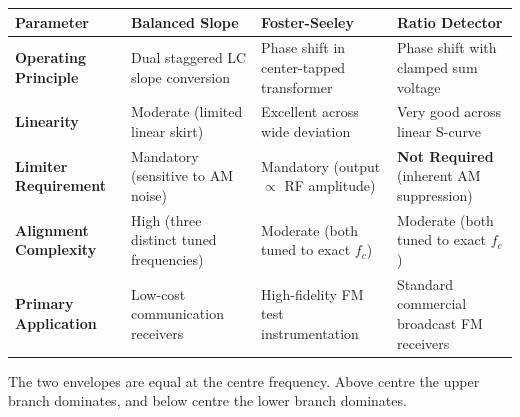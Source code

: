 \documentclass[12pt,a4paper]{article}
\begin{document}
\par\vspace{6pt}\noindent
\begin{tabularx}{\linewidth}{|B{3.2cm}|Y|Y|Y|}
\hline
\textbf{Parameter} & \textbf{Balanced Slope} & \textbf{Foster-Seeley} & \textbf{Ratio Detector} \\
\hline
\textbf{Operating Principle} & Dual staggered LC slope conversion & Phase shift in center-tapped transformer & Phase shift with clamped sum voltage \\
\hline
\textbf{Linearity} & Moderate (limited linear skirt) & Excellent across wide deviation & Very good across linear S-curve \\
\hline
\textbf{Limiter Requirement} & Mandatory (sensitive to AM noise) & Mandatory (output $\propto$ RF amplitude) & \textbf{Not Required} (inherent AM suppression) \\
\hline
\textbf{Alignment Complexity}& High (three distinct tuned frequencies) & Moderate (both tuned to exact $f_c$) & Moderate (both tuned to exact $f_c$) \\
\hline
\textbf{Primary Application}& Low-cost communication receivers & High-fidelity FM test instrumentation & Standard commercial broadcast FM receivers \\
\hline
\end{tabularx}
\par\vspace{12pt}

\begin{tcolorbox}[tikzbox, unbreakable, title={Balanced Frequency Discriminator}]
\centering
{}\par
\small The two envelopes are equal at the centre frequency. Above centre the upper branch dominates, and below centre the lower branch dominates.
\end{tcolorbox}
\end{document}
